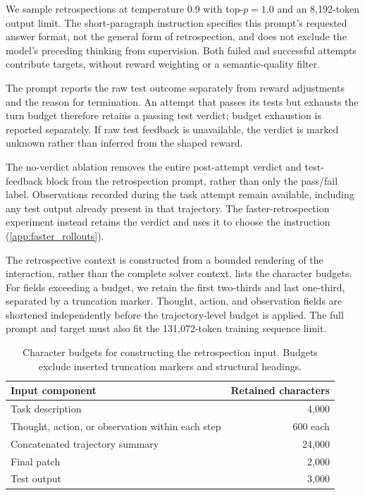 We sample retrospections at temperature 0.9 with top-$p=1.0$ and an
8,192-token output limit. The short-paragraph instruction specifies this
prompt's requested answer format, not the general form of retrospection,
and does not exclude the model's preceding thinking from supervision.
Both failed and successful attempts contribute
targets, without reward weighting or a semantic-quality filter.

The prompt reports the raw test outcome separately from reward adjustments
and the reason for termination. An attempt that passes its tests but
exhausts the turn budget therefore retains a passing test verdict;
budget exhaustion is reported separately. If raw test feedback is
unavailable, the verdict is marked unknown rather than inferred from
the shaped reward.

The no-verdict ablation removes the entire post-attempt verdict and
test-feedback block from the retrospection prompt, rather than only
the pass/fail label. Observations recorded during the task attempt
remain available, including any test output already present in that
trajectory.
The faster-retrospection experiment instead retains the verdict and uses
it to choose the instruction (\cref{app:faster_rollouts}).

The retrospective context is constructed from a bounded rendering of
the interaction, rather than the complete solver context.
 lists the character budgets.
For fields exceeding a budget, we retain the first two-thirds and last
one-third, separated by a truncation marker. Thought, action, and
observation fields are shortened independently before the trajectory-level
budget is applied. The full prompt and target must also fit the
131,072-token training sequence limit.

\begin{table}[H]
\centering
\small
\caption{Character budgets for constructing the retrospection input.
Budgets exclude inserted truncation markers and structural headings.}
\label{tab:retrospection_context}
\begin{tabularx}{0.85\linewidth}{@{}Xr@{}}
\toprule
Input component & Retained characters \\
\midrule
Task description & 4,000 \\
Thought, action, or observation within each step & 600 each \\
Concatenated trajectory summary & 24,000 \\
Final patch & 2,000 \\
Test output & 3,000 \\
\bottomrule
\end{tabularx}
\end{table}

